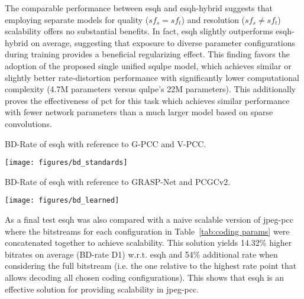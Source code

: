 The comparable performance between \gls{esqh} and \gls{esqh}-hybrid suggests that employing separate models for quality ($sf_s = sf_t$) and resolution ($sf_s \neq sf_t$) scalability offers no substantial benefits. In fact, \gls{esqh} slightly outperforms \gls{esqh}-hybrid on average, suggesting that exposure to diverse parameter configurations during training provides a beneficial regularizing effect. This finding favors the adoption of the proposed single unified \gls{squlpe} model, which achieves similar or slightly better rate-distortion performance with significantly lower computational complexity (4.7M parameters versus \gls{qulpe}'s 22M parameters). This additionally proves the effectiveness of \gls{pct} for this task which achieves similar performance with fewer network parameters than a much larger model based on sparse convolutions.

\begin{table*}
    \centering
    \caption{BD-Rate of \gls{esqh} with reference to G-PCC and V-PCC.}
    \texttt{[image: figures/bd\_standards]}
    \label{fig:bd_rqulpe_standards}
\end{table*}

\begin{table*}
    \centering
    \caption{BD-Rate of \gls{esqh} with reference to GRASP-Net and PCGCv2.}
    \texttt{[image: figures/bd\_learned]}
    \label{fig:bd_rqulpe_others}
\end{table*}


As a final test \gls{esqh} was also compared with a naive scalable version of \gls{jpeg-pcc} where the bitstreams for each configuration in Table~\ref{tab:coding params} were concatenated together to achieve scalability. This solution yields 14.32\% higher bitrates on average (BD-rate D1) w.r.t. \gls{esqh} and 54\% additional rate when considering the full bitstream (i.e. the one relative to the highest rate point that allows decoding all chosen coding configurations). This shows that \gls{esqh} is an effective solution for providing scalability in \gls{jpeg-pcc}.



